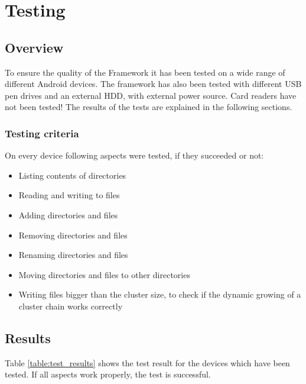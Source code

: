 \chapter{Testing}

\section{Overview}

To ensure the quality of the Framework it has been tested on a wide range of different Android devices. The framework has also been tested with different USB pen drives and an external HDD, with external power source. Card readers have not been tested! The results of the tests are explained in the following sections.

\subsection{Testing criteria}

On every device following aspects were tested, if they succeeded or not:

\begin{itemize}
\item Listing contents of directories
\item Reading and writing to files
\item Adding directories and files
\item Removing directories and files
\item Renaming directories and files
\item Moving directories and files to other directories
\item Writing files bigger than the cluster size, to check if the dynamic growing of a cluster chain works correctly
\end{itemize}

\section{Results}

Table \ref{table:test_results} shows the test result for the devices which have been tested. If all aspects work properly, the test is successful.

